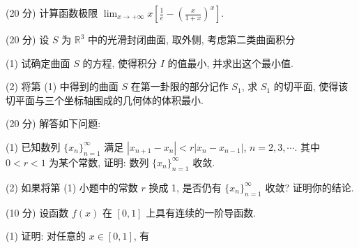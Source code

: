 \par{}
(20 分) 计算函数极限 $\lim_{x \to +\infty} x \left[ \frac{1}{e} - \left( \frac{x}{1 + x} \right)^x \right]$.\par
\par{}
\par{}
(20 分) 设 $S$ 为 $\mathbb{R}^3$ 中的光滑封闭曲面, 取外侧, 考虑第二类曲面积分\par
\nopagebreak[4]
(1) 试确定曲面 $S$ 的方程, 使得积分 $I$ 的值最小, 并求出这个最小值.\par
(2) 将第 (1) 中得到的曲面 $S$ 在第一卦限的部分记作 $S_{1}$, 求 $S_{1}$ 的切平面, 使得该切平面与三个坐标轴围成的几何体的体积最小.\par
\par{}
(20 分) 解答如下问题:\par
(1) 已知数列 $\{x_{n}\}_{n=1}^{\infty}$ 满足 $|x_{n+1}-x_{n}|<r|x_{n}-x_{n-1}|$, $n=2,3,\cdots$. 其中 $0<r<1$ 为某个常数, 证明: 数列 $\{x_{n}\}_{n=1}^{\infty}$ 收敛.\par
(2) 如果将第 (1) 小题中的常数 $r$ 换成 1, 是否仍有 $\{x_{n}\}_{n=1}^{\infty}$ 收敛? 证明你的结论.\par
\par{}
(10 分) 设函数 $f(x)$ 在 $[0, 1]$ 上具有连续的一阶导函数.\par
\par{}
(1) 证明: 对任意的 $x \in [0,1]$, 有\par
\nopagebreak[4]
